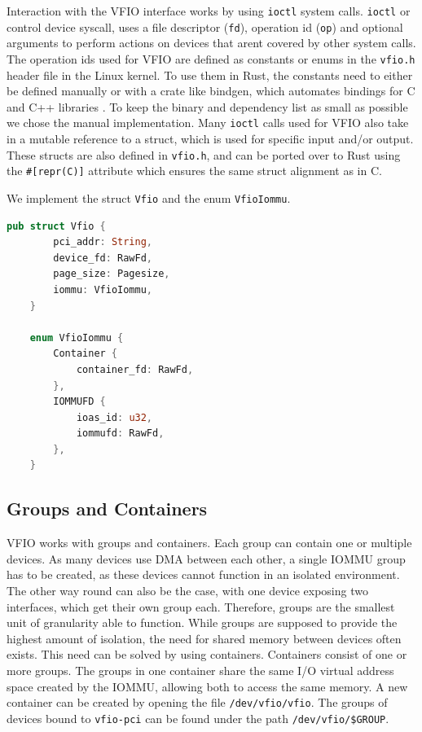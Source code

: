 Interaction with the VFIO interface works by using \texttt{ioctl} system calls.
\texttt{ioctl} or control device syscall, uses a file descriptor (\texttt{fd}), operation id (\texttt{op}) and optional arguments to perform actions on devices that arent covered by other system calls.
The operation ids used for VFIO are defined as constants or enums in the \texttt{vfio.h} header file in the Linux kernel. To use them in Rust, the constants need to either be defined manually or with a crate like bindgen, which automates bindings for C and C++ libraries \cite{cratebindgen}. To keep the binary and dependency list as small as possible we chose the manual implementation.
Many \texttt{ioctl} calls used for VFIO also take in a mutable reference to a struct, which is used for specific input and/or output. These structs are also defined in \texttt{vfio.h}, and can be ported over to Rust using the \texttt{\#[repr(C)]} attribute which ensures the same struct alignment as in C.

We implement the struct \texttt{Vfio} and the enum \texttt{VfioIommu}.

\begin{lstlisting}[language=Rust,caption={Structs used to model VFIO}, label=lst:vfiostructs]
    pub struct Vfio {
        pci_addr: String,
        device_fd: RawFd,
        page_size: Pagesize,
        iommu: VfioIommu,
    }

    enum VfioIommu {
        Container {
            container_fd: RawFd,
        },
        IOMMUFD {
            ioas_id: u32,
            iommufd: RawFd,
        },
    }
\end{lstlisting}

\subsection{Groups and Containers}
VFIO works with groups and containers. Each group can contain one or multiple devices. As many devices use DMA between each other, a single IOMMU group has to be created, as these devices cannot function in an isolated environment. The other way round can also be the case, with one device exposing two interfaces, which get their own group each. Therefore, groups are the smallest unit of granularity able to function. While groups are supposed to provide the highest amount of isolation, the need for shared memory between devices often exists. This need can be solved by using containers. Containers consist of one or more groups. The groups in one container share the same I/O virtual address space created by the IOMMU, allowing both to access the same memory.
A new container can be created by opening the file \texttt{/dev/vfio/vfio}. The groups of devices bound to \texttt{vfio-pci} can be found under the path \texttt{/dev/vfio/\$GROUP}.


